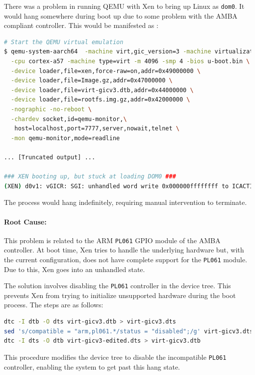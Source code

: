 \documentclass[acmtog]{acmart}
\begin{document}
There was a problem in running QEMU with Xen to bring up Linux as \texttt{dom0}. It would hang somewhere during boot up due to some problem with the AMBA compliant controller. This would be manifested as :

\begin{lstlisting}[language=bash, caption=QEMU stuck on unsupported GPIO module]
# Start the QEMU virtual emulation
$ qemu-system-aarch64  -machine virt,gic_version=3 -machine virtualization=true \
  -cpu cortex-a57 -machine type=virt -m 4096 -smp 4 -bios u-boot.bin \
  -device loader,file=xen,force-raw=on,addr=0x49000000 \
  -device loader,file=Image.gz,addr=0x47000000 \
  -device loader,file=virt-gicv3.dtb,addr=0x44000000 \
  -device loader,file=rootfs.img.gz,addr=0x42000000 \
  -nographic -no-reboot \
  -chardev socket,id=qemu-monitor,\
   host=localhost,port=7777,server,nowait,telnet \
  -mon qemu-monitor,mode=readline

... [Truncated output] ...

### XEN booting up, but stuck at loading DOM0 ###
(XEN) d0v1: vGICR: SGI: unhandled word write 0x000000ffffffff to ICACTIVER0
\end{lstlisting}

The process would hang indefinitely, requiring manual intervention to terminate.

\paragraph{Root Cause:}This problem is related to the ARM \texttt{PL061} GPIO module of the AMBA controller. At boot time, Xen tries to handle the underlying hardware but, with the current configuration, does not have complete support for the \texttt{PL061} module. Due to this, Xen goes into an unhandled state.

The solution involves disabling the \texttt{PL061} controller in the device tree. This prevents Xen from trying to initialize unsupported hardware during the boot process. The steps are as follows:

\begin{lstlisting}[language=bash, caption=Solution to QEMU stuck]
dtc -I dtb -O dts virt-gicv3.dtb > virt-gicv3.dts
sed 's/compatible = "arm,pl061.*/status = "disabled";/g' virt-gicv3.dts > virt-gicv3-edited.dts
dtc -I dts -O dtb virt-gicv3-edited.dts > virt-gicv3.dtb
\end{lstlisting}


This procedure modifies the device tree to disable the incompatible \texttt{PL061} controller, enabling the system to get past this hang state.
\end{document}
